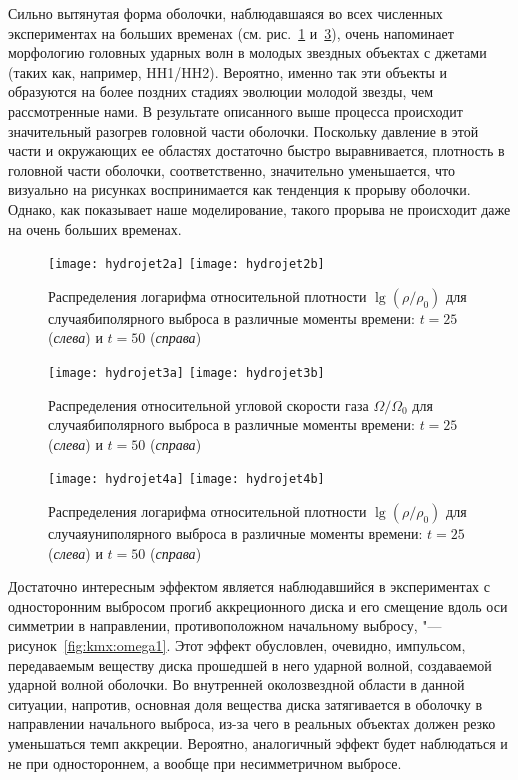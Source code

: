 Сильно вытянутая форма оболочки, наблюдавшаяся во всех численных
экспериментах на больших временах (см. рис.~\ref{fig:kmx:density2}
и~\ref{fig:kmx:density1}), очень напоминает морфологию головных ударных
волн в молодых звездных объектах с джетами (таких как, например, HH1/HH2).
Вероятно, именно так эти объекты и образуются на более поздних стадиях
эволюции молодой звезды, чем рассмотренные нами. В результате описанного
выше процесса происходит значительный разогрев головной части оболочки.
Поскольку давление в этой части и окружающих ее областях достаточно быстро
выравнивается, плотность в головной части оболочки, соответственно,
значительно уменьшается, что визуально на рисунках воспринимается
как тенденция к прорыву оболочки. Однако, как показывает наше
моделирование, такого прорыва не происходит даже на очень больших
временах.

\begin{figure}[!h]
\centering
\texttt{[image: hydrojet2a]}
\texttt{[image: hydrojet2b]}
\caption{Распределения логарифма относительной плотности ${\lg(\rho/\rho_0)}$ для случая\plb биполярного выброса в различные моменты времени: ${t = 25}$ (\emph{слева}) и ${t = 50}$ (\emph{справа})}
\label{fig:kmx:density2}
\end{figure}

\begin{figure}[!h]
\centering
\texttt{[image: hydrojet3a]}
\texttt{[image: hydrojet3b]}
\caption{Распределения относительной угловой скорости газа ${\Omega/\Omega_0}$ для случая\plb биполярного выброса в различные моменты времени: ${t = 25}$ (\emph{слева}) и ${t = 50}$ (\emph{справа})}
\label{fig:kmx:omega2}
\end{figure}

\begin{figure}[!h]
\centering
\texttt{[image: hydrojet4a]}
\texttt{[image: hydrojet4b]}
\caption{Распределения логарифма относительной плотности
${\lg(\rho/\rho_0)}$ для случая\plb униполярного выброса в различные
моменты времени: ${t = 25}$ (\emph{слева}) и ${t = 50}$ (\emph{справа})}
\label{fig:kmx:density1}
\end{figure}

Достаточно интересным эффектом является наблюдавшийся в экспериментах
с односторонним выбросом прогиб аккреционного диска и его смещение
вдоль оси симметрии в направлении, противоположном начальному
выбросу, "--- рисунок~\ref{fig:kmx:omega1}. Этот эффект обусловлен, очевидно,
импульсом, передаваемым веществу диска прошедшей в него ударной волной,
создаваемой ударной волной оболочки. Во внутренней околозвездной
области в данной ситуации, напротив, основная доля вещества диска
затягивается в оболочку в направлении начального выброса, из-за
чего в реальных объектах должен резко уменьшаться темп аккреции.
Вероятно, аналогичный эффект будет наблюдаться и не при
одностороннем, а вообще при несимметричном выбросе.


